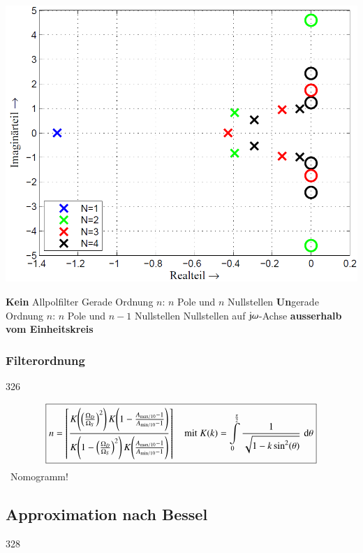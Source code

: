 \begin{minipage}[c]{0.4\columnwidth}
    \includegraphics[width=\columnwidth]{images/filter_cauer_pollage.png}
\end{minipage}
\hfill
\begin{minipage}[c]{0.58\columnwidth}
    \begin{outline}
        \1 \textbf{Kein} Allpolfilter
            \2 Gerade Ordnung $n$: $n$ Pole und $n$ Nullstellen
            \2 \textbf{Un}gerade Ordnung $n$: $n$ Pole und $n-1$ Nullstellen
        \1 Nullstellen auf $\mathrm{j} \omega$-Achse \textbf{ausserhalb vom Einheitskreis}
    \end{outline}
\end{minipage}


\subsubsection{Filterordnung}{326}

$$ \boxed{ n = \left\lceil \frac{ K \Bigg( \Big( \frac{\Omega_D}{\Omega_S} \Big)^2 \Bigg) \, K \Bigg( 1 - \frac{A_{\rm max / 10} - 1}{A_{\rm min / 10} - 1} \Bigg) }
    { K \Bigg( 1 -\Big( \frac{\Omega_D}{\Omega_S} \Big)^2 \Bigg) \, K \Bigg(\frac{A_{\rm max / 10} - 1}{A_{\rm min / 10} - 1} \Bigg) }  \right\rceil 
    \quad \text{mit } K(k) = \int\limits_{0}^{\frac{\pi}{2} }  \frac{1}{\sqrt{1- k \sin^2(\theta)}} \, \mathop{} \! \mathrm{d} \theta }$$
    \textrightarrow\ Nomogramm!


\subsection{Approximation nach Bessel}{328}

